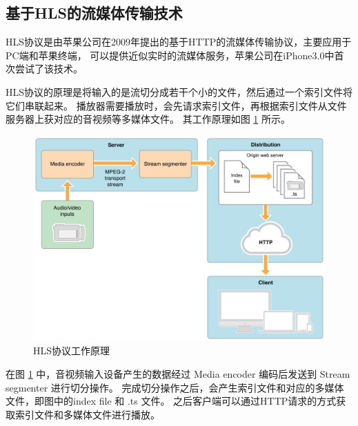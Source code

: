 
\subsection{基于HLS的流媒体传输技术}
HLS协议是由苹果公司在2009年提出的基于HTTP的流媒体传输协议，主要应用于PC端和苹果终端，
可以提供近似实时的流媒体服务，苹果公司在iPhone3.0中首次尝试了该技术\cite{魏雪飞2020HLS,曾清0基于}。

HLS协议的原理是将输入的是流切分成若干个小的文件，然后通过一个索引文件将它们串联起来。
播放器需要播放时，会先请求索引文件，再根据索引文件从文件服务器上获对应的音视频等多媒体文件。
其工作原理如图 \ref{Fig:hls} 所示。

\newpage
\begin{figure}[ht]
    \centering
    \includegraphics[width=1\linewidth]{./Figure/IMG_hls.png}
    \caption{HLS协议工作原理}
    \label{Fig:hls}
\end{figure}

在图  \ref{Fig:hls} 中，音视频输入设备产生的数据经过 Media encoder 编码后发送到 Stream segmenter 
进行切分操作。
完成切分操作之后，会产生索引文件和对应的多媒体文件，即图中的index file 和 .ts 文件。
之后客户端可以通过HTTP请求的方式获取索引文件和多媒体文件进行播放。




